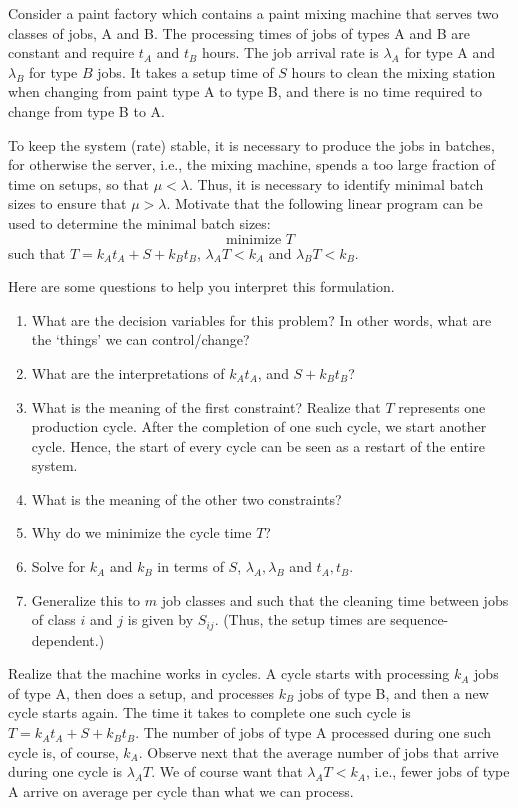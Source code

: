 \begin{exercise}
 Consider a paint factory which contains a paint mixing machine that serves two classes of jobs, A and B.
 The processing times of jobs of types A and B are constant and require $t_A$ and $t_B$ hours.
 The job arrival rate is $\lambda_A$ for type A and $\lambda_B$ for type $B$ jobs.
 It takes a setup time of $S$ hours to clean the mixing station when changing from paint type A to type B, and there is no time required to change from type B to A.

 To keep the system (rate) stable, it is necessary to produce the jobs in batches, for otherwise the server, i.e., the mixing machine, spends a too large fraction of time on setups, so that $\mu < \lambda$.
 Thus, it is necessary to identify minimal batch sizes to ensure that $\mu > \lambda$.
 Motivate that the following linear program can be used to determine the minimal batch sizes:
\begin{equation*}
 \text{minimize } T
\end{equation*}
such that $ T= k_A t_A + S + k_B t_B$, $\lambda_A T < k_A$ and $\lambda_B T < k_B$.
\begin{hint}
Here are some questions to help you interpret this formulation.
\begin{enumerate}
\item What are the decision variables for this problem? In other words, what are the `things' we can control/change?
\item What are the interpretations of $k_A t_A$, and $S+k_B t_B$?
\item What is the meaning of the first constraint? Realize that $T$
 represents one production cycle. After the completion of one such
 cycle, we start another cycle. Hence, the start of every cycle can
 be seen as a restart of the entire system.
\item What is the meaning of the other two constraints?
\item Why do we minimize the cycle time $T$?
\item Solve for $k_A$ and $k_B$ in terms of $S$, $\lambda_A, \lambda_B$ and $t_A, t_B$. 
\item Generalize this to $m$ job classes and such that the cleaning
 time between jobs of class $i$ and $j$ is given by $S_{i j}$. (Thus,
 the setup times are sequence-dependent.) 
\end{enumerate}
\end{hint}

\begin{solution}
 Realize that the machine works in cycles. A cycle starts with
 processing $k_A$ jobs of type A, then does a setup, and processes
 $k_B$ jobs of type B, and then a new cycle starts again. The time
 it takes to complete one such cycle is $T=k_A t_A + S + k_B t_B$.
 The number of jobs of type A processed during one such cycle is,
 of course, $k_A$. Observe next that the average number of jobs
 that arrive during one cycle is $\lambda_A T$. We of course want
 that $\lambda_A T< k_A$, i.e., fewer jobs of type A arrive on
 average per cycle than what we can process.
\end{solution}
\end{exercise}




